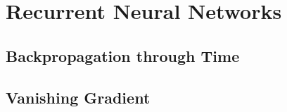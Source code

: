 \section{Recurrent Neural Networks}\label{sec:rnn}%

\subsection{Backpropagation through Time}

\subsection{Vanishing Gradient}%
